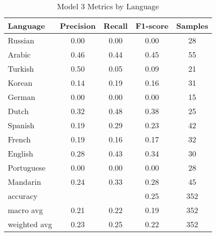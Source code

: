 \documentclass[11pt, letterpaper]{article}
\begin{document}
\begin{table}
\begin{center}
\caption{Model 3 Metrics by Language}
\begin{tabular}{l c c c| c}
Language  &Precision &Recall &F1-score&Samples\\ \hline
Russian	&0.00	&0.00	&0.00	&28\\
Arabic	&0.46	&0.44	&0.45	&55\\     
Turkish	&0.50	&0.05	&0.09	&21\\      
Korean	&0.14	&0.19 	&0.16	&31\\      
German	&0.00	&0.00	& 0.00 	&15\\       
Dutch	&0.32	&0.48	&0.38	&25\\   
Spanish	&0.19	&0.29	&0.23	&42\\      
French	&0.19	&0.16	&0.17	&32\\    
English	&0.28	&0.43	&0.34	&30\\  
Portuguese&0.00	&0.00	&0.00	&28\\    
Mandarin	&0.24	&0.33	&0.28	&45\\ \hline
      
accuracy		&		&		&0.25	&352\\
macro avg		& 0.21	&0.22	&0.19	&352\\
weighted avg	& 0.23	&0.25	&0.22	&352\\ \hline
\end{tabular}
\label{tab:LangClassReport}
\end{center}
\end{table}
\end{document}
